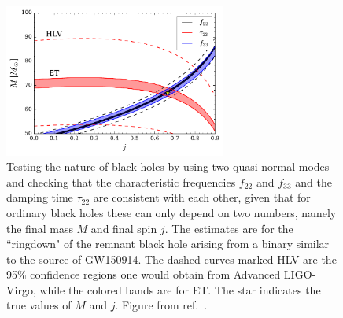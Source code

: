 \begin{figure}[t]
\centering
\includegraphics[width=0.65\textwidth]{Figures/3g_ringdown.pdf}
\caption{Testing the nature of black holes by using two quasi-normal modes and checking
that the characteristic frequencies $f_{22}$ and $f_{33}$ and the damping time $\tau_{22}$ are consistent
with each other, given that for ordinary black holes these can only depend on two numbers, namely
the final mass $M$ and final spin $j$. The estimates are for the ``ringdown" of the remnant
black hole arising from a binary similar to the source of GW150914. The dashed curves marked HLV 
are the 95\% confidence regions one would obtain from Advanced LIGO-Virgo, while the colored bands
are for ET. The star indicates the true values of $M$ and $j$. Figure  from ref.~\cite{3GScienceBook}.
}
\label{fig:ringdown}
\end{figure} 

